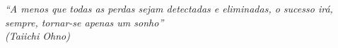 


\vspace*{\fill}
\begin{flushright}
	\textit{``A menos que todas as perdas sejam detectadas e eliminadas, o sucesso irá, sempre, tornar-se apenas um sonho'' \\
		(Taiichi Ohno)}
\end{flushright}

